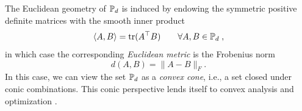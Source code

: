 \documentclass[sn-nature]{sn-jnl}%
\theoremstyle{thmstyleone}%
\theoremstyle{thmstyletwo}%
\theoremstyle{thmstylethree}%
\begin{document}
The Euclidean geometry of $\mathbb{P}_d$ is induced by endowing the symmetric positive definite matrices with the smooth inner product 
\[
\langle A, B \rangle = \text{tr}(A^\top B) \qquad \forall A,B \in \mathbb{P}_d \; ,
\]
in which case the corresponding \textit{Euclidean metric} is the Frobenius norm 
\[
d(A,B) = \|A - B\|_F.
\]
In this case, we can view the set $\mathbb{P}_d$ as a \textit{convex cone}, i.e., a set closed under conic combinations. This conic perspective lends itself to convex analysis and optimization \cite{Nesterov1994InteriorpointPA}. 





\end{document}
